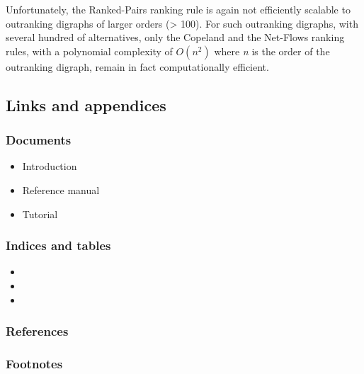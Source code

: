 \documentclass[letterpaper,10pt,english]{sphinxmanual}
\begin{document}
Unfortunately, the Ranked-Pairs ranking rule is again not efficiently scalable to outranking digraphs of larger orders (\textgreater{} 100). For such outranking digraphs, with several hundred of alternatives, only the Copeland and the Net-Flows ranking rules, with a polynomial complexity of \(O(n^2)\) where \emph{n} is the order of the outranking digraph, remain in fact computationally efficient.


\subsection{Links and appendices}
\label{tutorial:links-and-appendices}

\subsubsection{Documents}
\label{tutorial:documents}\begin{itemize}
\item {} 
Introduction

\item {} 
Reference manual

\item {} 
Tutorial

\end{itemize}


\subsubsection{Indices and tables}
\label{tutorial:indices-and-tables}\begin{itemize}
\item {} 

\item {} 

\item {} 

\end{itemize}


\subsubsection{References}
\label{tutorial:references}

\subsubsection{Footnotes}
\label{tutorial:footnotes}
\end{document}
